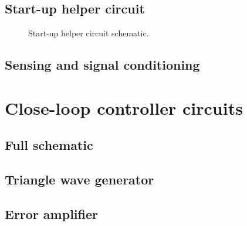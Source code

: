 

%

\subsection{Start-up helper circuit}
\begin{figure}[!h]
\centering

\caption[Start-up helper schematic]{Start-up helper circuit schematic.}
\label{fig:pwr_train_sch}
\end{figure}


\subsection{Sensing and signal conditioning}

\section{Close-loop controller circuits}
\subsection{Full schematic}
\subsection{Triangle wave generator}
\subsection{Error amplifier}


